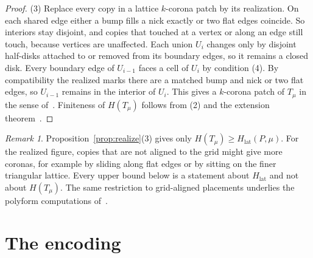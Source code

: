 \documentclass[11pt]{amsart}
\theoremstyle{definition}
\theoremstyle{remark}
\newtheorem{remark}[theorem]{Remark}
\newcommand{\Hl}{H_{\mathrm{lat}}}
\begin{document}
\begin{proof}
(3) Replace every copy in a lattice $k$-corona patch by its realization. On each shared edge either a bump fills a nick exactly or two flat edges coincide. So interiors stay disjoint, and copies that touched at a vertex or along an edge still touch, because vertices are unaffected. Each union $U_i$ changes only by disjoint half-disks attached to or removed from its boundary edges, so it remains a closed disk. Every boundary edge of $U_{i-1}$ faces a cell of $U_i$ by condition (4). By compatibility the realized marks there are a matched bump and nick or two flat edges, so $U_{i-1}$ remains in the interior of $U_i$. This gives a $k$-corona patch of $T_\mu$ in the sense of~\cite[Definition~1]{Basic2021}. Finiteness of $H(T_\mu)$ follows from (2) and the extension theorem~\cite[Section~3.8]{GS1987}.
\end{proof}

\begin{remark}
Proposition~\ref{prop:realize}(3) gives only $H(T_\mu)\ge\Hl(P,\mu)$. For the realized figure, copies that are not aligned to the grid might give more coronas, for example by sliding along flat edges or by sitting on the finer triangular lattice. Every upper bound below is a statement about $\Hl$ and not about $H(T_\mu)$. The same restriction to grid-aligned placements underlies the polyform computations of~\cite{Kaplan2022}.
\end{remark}

\section{The encoding}\label{sec:enc}
\end{document}
